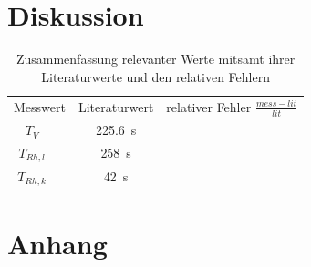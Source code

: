 
\section{Diskussion}
\begin{table}
\centering
\caption{Zusammenfassung relevanter Werte mitsamt ihrer Literaturwerte und den
relativen Fehlern}
\label{tab:3}
\begin{tabular}[H]{c c c c}
    \toprule
    \multicolumn{2}{c}{Messwert} & \multicolumn{1}{c}{Literaturwert } & \multicolumn{1}{c}{relativer Fehler $\frac{mess-lit}{lit} $ }\\
    \cmidrule(lr){1-4}
      $T_{V} $   &   & \SI{225.6}{\second}\cite{szabo1986determination}  &  \\
      $T_{Rh,l} $   &   & \SI{258}{\second} \cite{flammersfeld1946isomere}  &  \\
      $T_{Rh,k} $   &   & \SI{42}{\second} \cite{flammersfeld1946isomere}  &  \\
    \bottomrule
\end{tabular}
\end{table}


\newpage
\printbibliography
\newpage
\section*{Anhang}

\newpage

